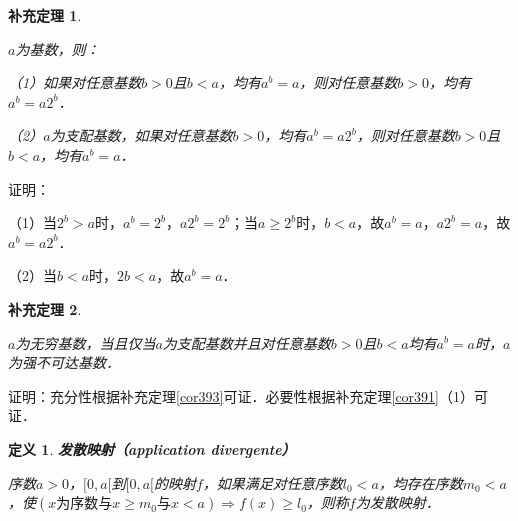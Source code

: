 \documentclass[12pt, a4paper, oneside]{book}
\newtheorem{cor}{补充定理}
\newtheorem{de}{定义}
\begin{document}
			\begin{cor}\label{cor401}
				\hfill\par
				$a$为基数，则：
				\par
				（1）如果对任意基数$b>0$且$b<a$，均有$a^b=a$，则对任意基数$b>0$，均有$a^b=a2^b$．
				\par
				（2）$a$为支配基数，如果对任意基数$b>0$，均有$a^b=a2^b$，则对任意基数$b>0$且$b<a$，均有$a^b=a$．
			\end{cor}
			证明：
			\par
			（1）当$2^b>a$时，$a^b=2^b$，$a2^b=2^b$；当$a\geq 2^b$时，$b<a$，故$a^b=a$，$a2^b=a$，故$a^b=a2^b$．
			\par
			（2）当$b<a$时，$2b<a$，故$a^b=a$．
			
			\begin{cor}\label{cor402}
				\hfill\par
				$a$为无穷基数，当且仅当$a$为支配基数并且对任意基数$b>0$且$b<a$均有$a^b=a$时，$a$为强不可达基数．
			\end{cor}
			证明：充分性根据补充定理\ref{cor393}可证．必要性根据补充定理\ref{cor391}（1）可证．
			
			\begin{de}
				\textbf{发散映射（application divergente）}
				\par
				序数$a>0$，$[0, a[$到$[0, a[$的映射$f$，如果满足对任意序数$l_0<a$，均存在序数$m_0<a$，使$(x\text{为序数}\text{与}x\geq m_0\text{与}x<a)\Rightarrow f(x)\geq l_0$，则称$f$为发散映射．
			\end{de}
			
\end{document}
